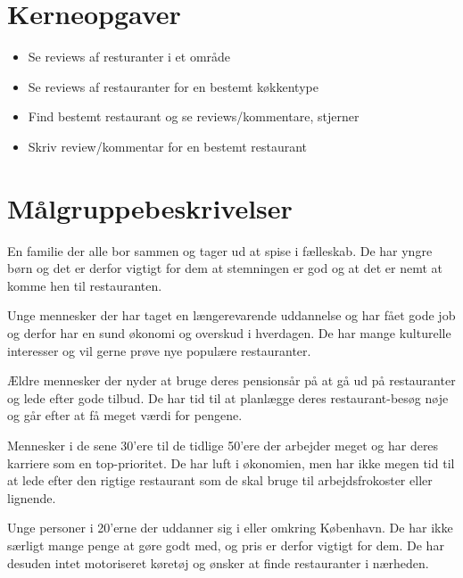 \documentclass[a4paper, 12pt]{article}
\begin{document}
\section{Kerneopgaver}
\label{sec:Kerneopgaver}
\begin{itemize}
\item Se reviews af resturanter i et område
\item Se reviews af restauranter for en bestemt køkkentype
\item Find bestemt restaurant og se reviews/kommentare, stjerner
\item Skriv review/kommentar for en bestemt restaurant
\end{itemize}

\section{Målgruppebeskrivelser}
\label{sec:Maalgruppebeskrivelser}

\begin{description}[style=nextline,font=\bf]
  \item[Familier med små børn]

    En familie der alle bor sammen og tager ud at spise i
    fælleskab. De har yngre børn og det er derfor vigtigt for dem at
    stemningen er god og at det er nemt at komme hen til restauranten.

  \item[25--30 årige storby-par uden børn]

    Unge mennesker der har taget en længerevarende uddannelse og har
    fået gode job og derfor har en sund økonomi og overskud i
    hverdagen. De har mange kulturelle interesser og vil gerne prøve
    nye populære restauranter.

  \item[Pensionister]

    Ældre mennesker der nyder at bruge deres pensionsår på at gå ud på
    restauranter og lede efter gode tilbud. De har tid til at
    planlægge deres restaurant-besøg nøje og går efter at få meget
    værdi for pengene.

  \item[Karrieremennesker]

    Mennesker i de sene 30'ere til de tidlige 50'ere der arbejder
    meget og har deres karriere som en top-prioritet. De har luft i
    økonomien, men har ikke megen tid til at lede efter den rigtige
    restaurant som de skal bruge til arbejdsfrokoster eller lignende.

  \item[Studerende]

    Unge personer i 20'erne der uddanner sig i eller omkring
    København. De har ikke særligt mange penge at gøre godt med, og
    pris er derfor vigtigt for dem. De har desuden intet motoriseret
    køretøj og ønsker at finde restauranter i nærheden.
\end{description}
\end{document}
